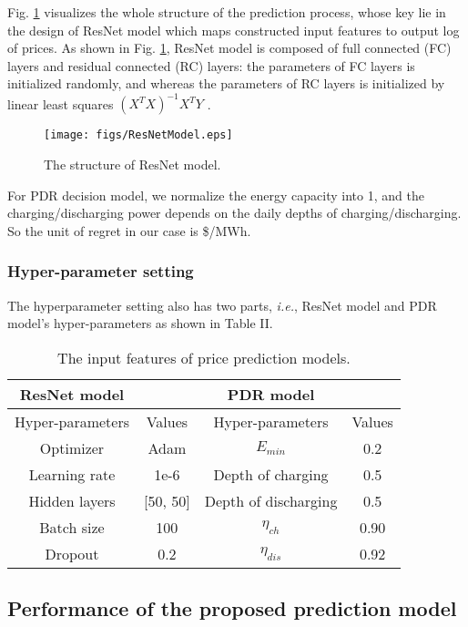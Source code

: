 \documentclass[journal]{IEEEtran}
\begin{document}
Fig. \ref{structure} visualizes the whole structure of the prediction process, whose key lie in the design of ResNet model which maps constructed input features to output log of prices. As shown in Fig. \ref{structure}, ResNet model is composed of full connected (FC) layers and residual connected (RC) layers: the parameters of FC layers is initialized randomly, and whereas the parameters of RC layers is initialized by linear least squares $(X^T X)^{-1} X^T Y$  \cite{Rencher2012}.
\begin{figure}[ht]
  \centering
  \texttt{[image: figs/ResNetModel.eps]}
  \caption{The structure of ResNet model.}
  \label{structure}
\end{figure}

For PDR decision model, we normalize the energy capacity into 1, and the charging/discharging power depends on the daily depths of charging/discharging. So the unit of regret in our case is \$/MWh.

\subsubsection{Hyper-parameter setting}
The hyperparameter setting also has two parts, \textit{i.e.}, ResNet model and PDR model's hyper-parameters as shown in Table II. 

\begin{table}[ht]
  \renewcommand{\arraystretch}{1.3}
  \centering
  \label{hyperparameters}
  \caption{The input features of price prediction models.}
  \begin{tabular}{cc|cc}
    \hline
    \bfseries{ResNet model} & & \bfseries{PDR model} & \\
    \hline
     Hyper-parameters & Values & Hyper-parameters & Values \\
    \hline
     Optimizer & Adam & $E_{min}$ & 0.2 \\
     Learning rate & 1e-6 & Depth of charging & 0.5  \\
     Hidden layers & [50, 50] & Depth of discharging & 0.5 \\
     Batch size& 100 & $\eta_{ch}$ & 0.90 \\
     Dropout & 0.2 & $\eta_{dis}$ & 0.92 \\
    \hline
  \end{tabular}
\end{table}

\subsection{Performance of the proposed prediction model}
\end{document}
